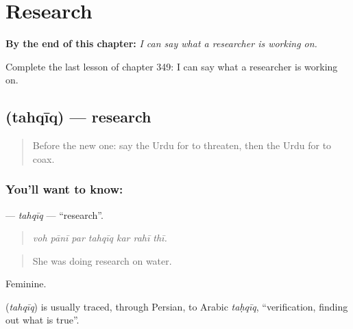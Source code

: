 
\chapter{Research}
\label{ch:ur-research}

\begin{chapteropening}
\textbf{By the end of this chapter:} \emph{I can say what a researcher is working on.}

Complete the last lesson of chapter 349: I can say what a researcher is working on.
\end{chapteropening}

\section[\texorpdfstring{\ur{تحقیق} (tahqīq)}{تحقیق (tahqīq)}]{ (tahqīq) — research}

\label{lesson:UR-C349-tahqiq}



\begin{quote}
Before the new one: say the Urdu for to threaten, then the Urdu for to coax.
\end{quote}

\subsection*{You'll want to know: }
\textbf{} — \emph{tahqīq} — \textquotedblleft{}research\textquotedblright{}.

\begin{quote}
      
\end{quote}

\begin{quote}
\emph{voh pānī par tahqīq kar rahī thī.}
\end{quote}

\begin{quote}
She was doing research on water.
\end{quote}

Feminine.

\begin{cousinweb}
\textbf{} (\emph{tahqīq}) is usually traced, through Persian, to Arabic \emph{taḥqīq}, \textquotedblleft{}verification, finding out what is true\textquotedblright{}.
\end{cousinweb}

